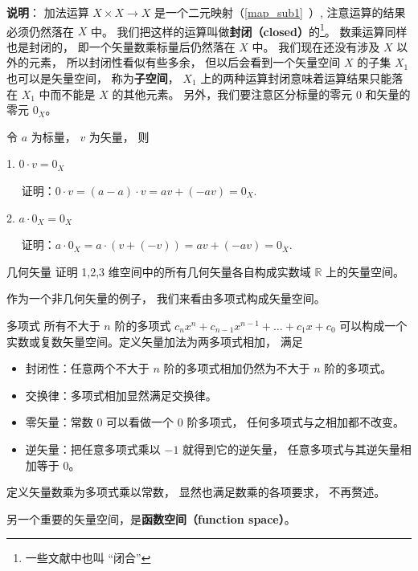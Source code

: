 \textbf{说明}： 加法运算 $X \times X \to X$ 是一个二元映射（\autoref{map_sub1}~）, 注意运算的结果必须仍然落在 $X$ 中。 我们把这样的运算叫做\textbf{封闭（closed）}的\footnote{一些文献中也叫 “闭合”}。 数乘运算同样也是封闭的， 即一个矢量数乘标量后仍然落在 $X$ 中。 我们现在还没有涉及 $X$ 以外的元素， 所以封闭性看似有些多余， 但以后会看到一个矢量空间 $X$ 的子集 $X_1$ 也可以是矢量空间， 称为\textbf{子空间}， $X_1$ 上的两种运算封闭意味着运算结果只能落在 $X_1$ 中而不能是 $X$ 的其他元素。 另外，我们要注意区分标量的零元 $0$ 和矢量的零元 $0_X$。

\begin{corollary}{}
令 $a$ 为标量， $v$ 为矢量， 则

1. $0\cdot v=0_X$

$\quad$ 证明：$0\cdot v=(a-a)\cdot v=av+(-av)=0_X$.

2. $a \cdot 0_X=0_X$

$\quad$ 证明：$a \cdot 0_X=a\cdot(v+(-v))=av+(-av)=0_X$.

\end{corollary}

\begin{exercise}{几何矢量}
证明 1,2,3 维空间中的所有几何矢量各自构成实数域 $\mathbb R$ 上的矢量空间。
\end{exercise}

作为一个非几何矢量的例子， 我们来看由多项式构成矢量空间。

\begin{example}{多项式}\label{LSpace_ex1}
所有不大于 $n$ 阶的多项式 $c_n x^n + c_{n-1} x^{n-1} + \dots + c_1 x + c_0$ 可以构成一个实数或复数矢量空间。定义矢量加法为两多项式相加， 满足
\begin{itemize}
\item 封闭性：任意两个不大于 $n$ 阶的多项式相加仍然为不大于 $n$ 阶的多项式。
\item 交换律：多项式相加显然满足交换律。
\item 零矢量：常数 0 可以看做一个 0 阶多项式， 任何多项式与之相加都不改变。
\item 逆矢量：把任意多项式乘以 $-1$ 就得到它的逆矢量， 任意多项式与其逆矢量相加等于 0。
\end{itemize}
定义矢量数乘为多项式乘以常数， 显然也满足数乘的各项要求， 不再赘述。
\end{example}

另一个重要的矢量空间，是\textbf{函数空间（function space）}。

